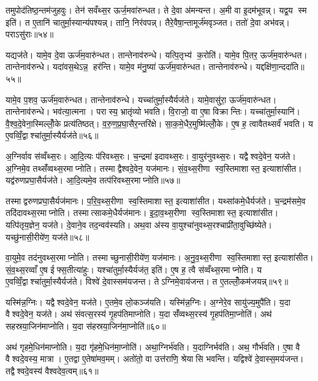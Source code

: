 तमुपोद॑तिष्ठ॒न्तम॑जुहवुः। तेन॑ सवँथ्स॒र ऊर्ज॒मवा॑रुन्धत। ते दे॒वा अ॑मन्यन्त। अ॒मी वा इ॒दम॑भूवन्न्। यद्व॒य स्म इति॑। त ए॒तानि॑ चातुर्मा॒स्यान्य॑पश्यन्न्। तानि॒ निर॑वपन्न्। तैरे॒वैषा॒न्तामूर्ज॑मवृञ्जत। ततो॑ दे॒वा अभ॑वन्न्। पराऽसु॑राः॥५४॥

यद्यज॑ते। यामे॒व दे॒वा ऊर्ज॑म॒वारु॑न्धत। तान्तेनाव॑रुन्धे। यत्पि॒तृभ्य॑ क॒रोति॑। यामे॒व पि॒तर॒ ऊर्ज॑म॒वारु॑न्धत। तान्तेनाव॑रुन्धे। यदा॑वस॒थेऽन्न॒ हर॑न्ति। यामे॒व म॑नु॒ष्या॑ ऊर्ज॑म॒वारु॑न्धत। तान्तेनाव॑रुन्धे। यद्दक्षि॑णा॒न्ददा॑ति॥५५॥

यामे॒व प॒शव॒ ऊर्ज॑म॒वारु॑न्धत। तान्तेनाव॑रुन्धे। यच्चा॑तुर्मा॒स्यैर्यज॑ते। यामे॒वासु॑रा॒ ऊर्ज॑म॒वारु॑न्धत। तान्तेनाव॑रुन्धे। भव॑त्या॒त्मना। परास्य॒ भ्रातृ॑व्यो भवति। वि॒राजो॒ वा ए॒षा विक्रान्तिः। यच्चा॑तुर्मा॒स्यानि॑। वै॒श्व॒दे॒वेना॒स्मिल्लोँ॒के प्रत्य॑तिष्ठत्। व॒रु॒ण॒प्र॒घा॒सैर॒न्तरि॑क्षे। सा॒क॒मे॒धैर॒मुष्मि॑ल्लोँ॒के। ए॒ष ह॒ त्वावैतथ्सर्वं॑ भवति। य ए॒वव्विँ॒द्वाश्चा॑तुर्मा॒स्यैर्यज॑ते॥५६॥

अ॒ग्निर्वाव स॑व्वँथ्स॒रः। आ॒दि॒त्यः प॑रिवथ्स॒रः। च॒न्द्रमा॑ इदावथ्स॒रः। वा॒युर॑नुवथ्स॒रः। यद्वैश्वदे॒वेन॒ यज॑ते। अ॒ग्निमे॒व तथ्सँ॑व्वथ्स॒रमाप्नोति। तस्माद्वैश्वदे॒वेन॒ यज॑मानः। सं॒व॒थ्स॒रीणा स्व॒स्तिमाशास्त॒ इत्याशा॑सीत। यद्व॑रुणप्रघा॒सैर्यज॑ते। आ॒दि॒त्यमे॒व तत्प॑रिवथ्स॒रमाप्नोति॥५७॥

तस्माद्वरुणप्रघा॒सैर्यज॑मानः। प॒रि॒व॒थ्स॒रीणा स्व॒स्तिमाशास्त॒ इत्याशा॑सीत। यथ्सा॑कमे॒धैर्यज॑ते। च॒न्द्रम॑समे॒व तदि॑दावथ्स॒रमाप्नोति। तस्मात्साकमे॒धैर्यज॑मानः। इ॒दा॒व॒थ्स॒रीणा स्व॒स्तिमाशास्त॒ इत्याशा॑सीत। यत्पि॑तृय॒ज्ञेन॒ यज॑ते। दे॒वाने॒व तद॒न्वव॑स्यति। अथ॒वा अ॑स्य वा॒युश्चा॑नुवथ्स॒रश्चाप्री॑ता॒वुच्छि॑ष्येते। यच्छु॑नासी॒रीये॑ण॒ यज॑ते॥५८॥

वा॒युमे॒व तद॑नुवथ्स॒रमाप्नोति। तस्माच्छुनासी॒रीये॑ण॒ यज॑मानः। अ॒नु॒व॒थ्स॒रीणा स्व॒स्तिमाशास्त॒ इत्याशा॑सीत। सं॒व॒थ्स॒रव्वाँ ए॒ष ईफ्स॒तीत्या॑हुः। यश्चा॑तुर्मा॒स्यैर्यज॑त॒ इति॑। ए॒ष ह॒ त्वै स॑व्वँथ्स॒रमाप्नोति। य ए॒वव्विँ॒द्वाश्चा॑तुर्मा॒स्यैर्यज॑ते। विश्वे॑ दे॒वास्सम॑यजन्त। तेऽग्निमे॒वाय॑जन्त। त ए॒तल्लोँ॒कम॑जयन्न्॥५९॥

यस्मि॑न्न॒ग्निः। यद्वैश्वदे॒वेन॒ यज॑ते। ए॒तमे॒व लो॒कञ्ज॑यति। यस्मि॑न्न॒ग्निः। अ॒ग्नेरे॒व सायु॑ज्य॒मुपै॑ति। य॒दा वैश्वदे॒वेन॒ यज॑ते। अथ॑ संवत्स॒रस्य॑ गृ॒हप॑तिमाप्नोति। य॒दा सँ॑व्वथ्स॒रस्य॑ गृ॒हप॑तिमा॒प्नोति॑। अथ॑ सहस्रया॒जिन॑माप्नोति। य॒दा स॑हस्रया॒जिन॑मा॒प्नोति॑॥६०॥

अथ॑ गृहमे॒धिन॑माप्नोति। य॒दा गृ॑हमे॒धिन॑मा॒प्नोति॑। अथा॒ग्निर्भ॑वति। य॒दाग्निर्भव॑ति। अथ॒ गौर्भ॑वति। ए॒षा वै वैश्वदे॒वस्य॒ मात्रा। ए॒तद्वा ए॒तेषा॑मव॒मम्। अतो॑तो॒ वा उत्त॑राणि॒ श्रेयासि भवन्ति। यद्विश्वे॑ दे॒वास्स॒मय॑जन्त। तद्वैश्वदे॒वस्य॑ वैश्वदेव॒त्वम्॥६१॥

